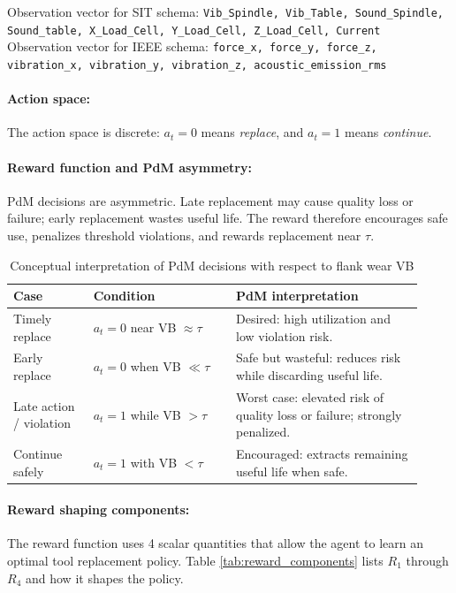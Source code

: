 \documentclass[sn-basic]{sn-jnl}%
\begin{document}
Observation vector for SIT schema: \texttt{Vib\_Spindle, Vib\_Table, Sound\_Spindle, Sound\_table, X\_Load\_Cell, Y\_Load\_Cell, Z\_Load\_Cell, Current}\\

Observation vector for IEEE schema: \texttt{force\_x, force\_y, force\_z, vibration\_x, vibration\_y, vibration\_z, acoustic\_emission\_rms}

\paragraph{Action space:}
The action space is discrete: $a_t=0$ means \emph{replace}, and $a_t=1$ means \emph{continue}.

\paragraph{Reward function and PdM asymmetry:}
PdM decisions are asymmetric. Late replacement may cause quality loss or failure; early replacement wastes useful life. The reward therefore encourages safe use, penalizes threshold violations, and rewards replacement near $\tau$.

\begin{table}[htbp]
	\centering
	\caption{Conceptual interpretation of PdM decisions with respect to flank wear VB}
	\label{tab:cost_view}
	\begin{tabular}{L{0.18\linewidth} L{0.32\linewidth} L{0.42\linewidth}}
		\toprule
		\textbf{Case} & \textbf{Condition} & \textbf{PdM interpretation}\\
		\midrule
		Timely replace & $a_t=0$ near VB $\approx\tau$ & Desired: high utilization and low violation risk.\\
		Early replace & $a_t=0$ when VB $\ll\tau$ & Safe but wasteful: reduces risk while discarding useful life.\\
		Late action / violation & $a_t=1$ while VB $>\tau$ & Worst case: elevated risk of quality loss or failure; strongly penalized.\\
		Continue safely & $a_t=1$ with VB $<\tau$ & Encouraged: extracts remaining useful life when safe.\\
		\bottomrule
	\end{tabular}
\end{table}

\paragraph{Reward shaping components:} The reward function uses 4 scalar quantities that allow the agent to learn an optimal tool replacement policy. Table \ref{tab:reward_components} lists $R_1$ through $R_4$ and how it shapes the policy.
\end{document}
